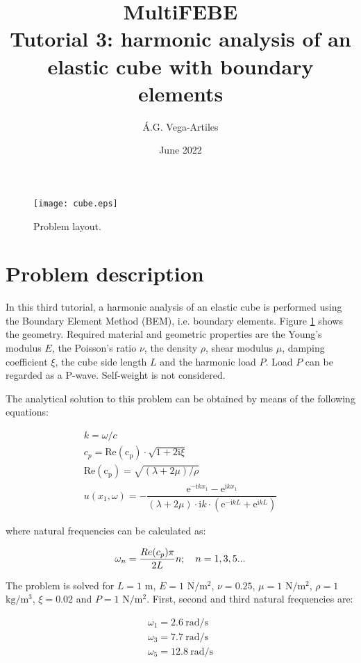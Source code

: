 \documentclass[a4]{article}
\title{MultiFEBE \\ Tutorial 3: harmonic analysis of an elastic cube with boundary elements}
\author{\'A.G. Vega-Artiles}
\date{June 2022}
\begin{document}
\maketitle

\begin{figure}[h]
	\centering
	\texttt{[image: cube.eps]}
	\caption{Problem layout.}
	\label{fig:cube}
\end{figure}

\section{Problem description}

In this third tutorial, a harmonic analysis of an elastic cube is performed using the Boundary Element Method (BEM), i.e. boundary elements. Figure \ref{fig:cube} shows the geometry. Required material and geometric properties are the Young's modulus $E$, the Poisson's ratio  $\nu$, the density $\rho$, shear modulus $\mu$, damping coefficient $\xi$, the cube side length $L$ and the harmonic load $P$. Load $P$ can be regarded as a P-wave. Self-weight is not considered. 

The analytical solution to this problem can be obtained by means of the following equations:

\begin{equation}
	\begin{array}{l}
		k = \omega/c \\
		c_p = \mathrm{Re(c_p)}\cdot\sqrt{1+2\mathrm{i}\xi} \\
		\mathrm{Re(c_p)} = \sqrt{(\lambda+2\mu)/\rho} \\
		u(x_1,\omega) = - \dfrac{\mathrm{e}^{-\mathrm{i}kx_1}-\mathrm{e}^{\mathrm{i}kx_1}}{(\lambda+2\mu)\cdot\mathrm{i}k\cdot(\mathrm{e}^{-\mathrm{i}kL}+\mathrm{e}^{\mathrm{i}kL})}
	\end{array}
\end{equation}

where natural frequencies can be calculated as:

\begin{equation}
	\centering
	\omega_n=\frac{Re(c_p)\pi}{2L}n;\quad n=1,3,5...
\end{equation}

The problem is solved for $L=1$ $\mathrm{m}$, $E=1$ $\mathrm{N/m^2}$, $\nu=0.25$, $\mu=1$ $\mathrm{N/m^2}$, $\rho=1$ $\mathrm{kg/m^3}$, $\xi=0.02$ and $P=1$ $\mathrm{N/m^2}$. First, second and third natural frequencies are: 

\begin{equation}
	\begin{array}{l}
		\omega_1 = 2.6 \medspace \mathrm{rad/s} \\
		\omega_3 = 7.7 \medspace \mathrm{rad/s} \\
		\omega_5 = 12.8 \medspace \mathrm{rad/s}
	\end{array}
\end{equation}
\end{document}
